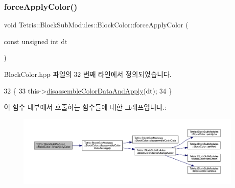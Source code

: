 \subsubsection{\texorpdfstring{force\+Apply\+Color()}{forceApplyColor()}}
{\footnotesize\ttfamily void Tetris\+::\+Block\+Sub\+Modules\+::\+Block\+Color\+::force\+Apply\+Color (\begin{DoxyParamCaption}\item[{const unsigned int}]{dt }\end{DoxyParamCaption})\hspace{0.3cm}{\ttfamily [inline]}}



Block\+Color.\+hpp 파일의 32 번째 라인에서 정의되었습니다.


\begin{DoxyCode}
32                                                        \{
33                 this->\hyperlink{class_tetris_1_1_block_sub_modules_1_1_block_color_afc3bb979353c91cf992101ed2dde610f}{disassembleColorDataAndApply}(dt);
34             \}
\end{DoxyCode}
이 함수 내부에서 호출하는 함수들에 대한 그래프입니다.\+:
\nopagebreak
\begin{figure}[H]
\begin{center}
\leavevmode
\includegraphics[width=350pt]{de/d44/class_tetris_1_1_block_sub_modules_1_1_block_color_a260b5dd85cdf3145be7564dc2c0ee53d_cgraph}
\end{center}
\end{figure}
\mbox{\label{class_tetris_1_1_block_sub_modules_1_1_block_color_ae6d640629b11d880ca994923657adbe1}} 
